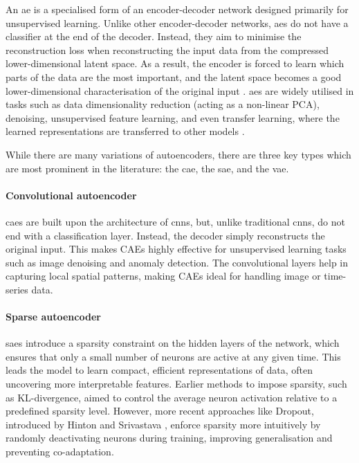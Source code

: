 An \acrlong{ae} is a specialised form of an encoder-decoder network designed primarily for unsupervised learning. Unlike other encoder-decoder networks, \acrlong{ae}s do not have a classifier at the end of the decoder. Instead, they aim to minimise the reconstruction loss when reconstructing the input data from the compressed lower-dimensional latent space. As a result, the encoder is forced to learn which parts of the data are the most important, and the latent space becomes a good lower-dimensional characterisation of the original input \cite{ng_sparse_2010}. \Acrlong{ae}s are widely utilised in tasks such as data dimensionality reduction (acting as a non-linear PCA), denoising, unsupervised feature learning, and even transfer learning, where the learned representations are transferred to other models \cite{goodfellow_deep_2016}.

While there are many variations of autoencoders, there are three key types which are most prominent in the literature: the \acrfull{cae}, the \acrfull{sae}, and the \acrfull{vae}.

\paragraph{Convolutional autoencoder} \acrshort{cae}s are built upon the architecture of \acrshort{cnn}s, but, unlike traditional \acrshort{cnn}s, do not end with a classification layer. Instead, the decoder simply reconstructs the original input. This makes CAEs highly effective for unsupervised learning tasks such as image denoising and anomaly detection. The convolutional layers help in capturing local spatial patterns, making CAEs ideal for handling image or time-series data.

\paragraph{Sparse autoencoder} \acrshort{sae}s introduce a sparsity constraint on the hidden layers of the network, which ensures that only a small number of neurons are active at any given time. This leads the model to learn compact, efficient representations of data, often uncovering more interpretable features. Earlier methods to impose sparsity, such as KL-divergence, aimed to control the average neuron activation relative to a predefined sparsity level. However, more recent approaches like Dropout, introduced by Hinton and Srivastava \cite{hinton_improving_2012, srivastava_dropout_2014}, enforce sparsity more intuitively by randomly deactivating neurons during training, improving generalisation and preventing co-adaptation.

